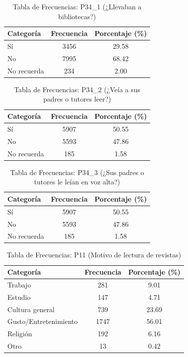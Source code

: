 \documentclass[aps,reprint]{revtex4-2}
\begin{document}
\begin{table}[h!]
\centering
\caption{Tabla de Frecuencias: P34\_1 (¿Llevaban a bibliotecas?)}
\begin{tabular}{lcc}
\toprule
\textbf{Categoría} & \textbf{Frecuencia} & \textbf{Porcentaje (\%)} \\
\midrule
Sí & 3456 & 29.58 \\
No & 7995 & 68.42 \\
No recuerda & 234 & 2.00 \\
\bottomrule
\end{tabular}
\end{table}

\begin{table}[h!]
\centering
\caption{Tabla de Frecuencias: P34\_2 (¿Veía a sus padres o tutores leer?)}
\begin{tabular}{lcc}
\toprule
\textbf{Categoría} & \textbf{Frecuencia} & \textbf{Porcentaje (\%)} \\
\midrule
Sí & 5907 & 50.55 \\
No & 5593 & 47.86 \\
No recuerda & 185 & 1.58 \\
\bottomrule
\end{tabular}
\end{table}

\begin{table}[h!]
\centering
\caption{Tabla de Frecuencias: P34\_3 (¿Sus padres o tutores le leían en voz alta?)}
\begin{tabular}{lcc}
\toprule
\textbf{Categoría} & \textbf{Frecuencia} & \textbf{Porcentaje (\%)} \\
\midrule
Sí & 5907 & 50.55 \\
No & 5593 & 47.86 \\
No recuerda & 185 & 1.58 \\
\bottomrule
\end{tabular}
\end{table}
\begin{table}[h!]
\centering
\caption{Tabla de Frecuencias: P11 (Motivo de lectura de revistas)}
\begin{tabular}{lcc}
\toprule
\textbf{Categoría} & \textbf{Frecuencia} & \textbf{Porcentaje (\%)} \\
\midrule
Trabajo & 281 & 9.01 \\
Estudio & 147 & 4.71 \\
Cultura general & 739 & 23.69 \\
Gusto/Entretenimiento & 1747 & 56.01 \\
Religión & 192 & 6.16 \\
Otro & 13 & 0.42 \\
\bottomrule
\end{tabular}
\end{table}
\end{document}
